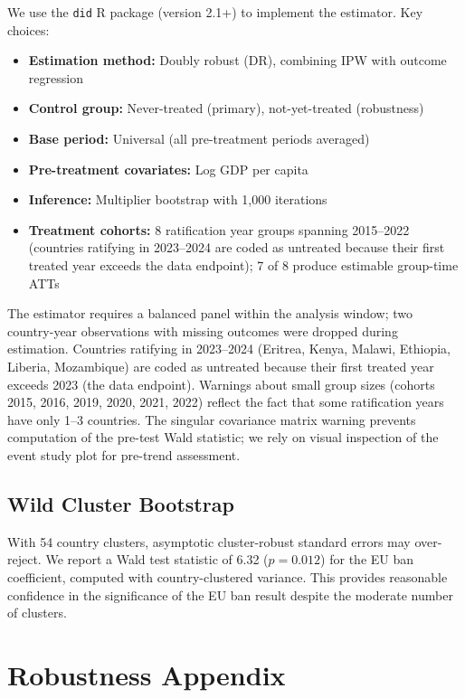 \documentclass[12pt]{article}
\begin{document}
We use the \texttt{did} R package (version 2.1+) to implement the \citet{callaway2021difference} estimator. Key choices:
\begin{itemize}
\item \textbf{Estimation method:} Doubly robust (DR), combining IPW with outcome regression \citep{santanna2020doubly}
\item \textbf{Control group:} Never-treated (primary), not-yet-treated (robustness)
\item \textbf{Base period:} Universal (all pre-treatment periods averaged)
\item \textbf{Pre-treatment covariates:} Log GDP per capita
\item \textbf{Inference:} Multiplier bootstrap with 1,000 iterations
\item \textbf{Treatment cohorts:} 8 ratification year groups spanning 2015--2022 (countries ratifying in 2023--2024 are coded as untreated because their first treated year exceeds the data endpoint); 7 of 8 produce estimable group-time ATTs
\end{itemize}

The estimator requires a balanced panel within the analysis window; two country-year observations with missing outcomes were dropped during estimation. Countries ratifying in 2023--2024 (Eritrea, Kenya, Malawi, Ethiopia, Liberia, Mozambique) are coded as untreated because their first treated year exceeds 2023 (the data endpoint). Warnings about small group sizes (cohorts 2015, 2016, 2019, 2020, 2021, 2022) reflect the fact that some ratification years have only 1--3 countries. The singular covariance matrix warning prevents computation of the pre-test Wald statistic; we rely on visual inspection of the event study plot for pre-trend assessment.

\subsection{Wild Cluster Bootstrap}

With 54 country clusters, asymptotic cluster-robust standard errors may over-reject. We report a Wald test statistic of 6.32 ($p = 0.012$) for the EU ban coefficient, computed with country-clustered variance. This provides reasonable confidence in the significance of the EU ban result despite the moderate number of clusters.


\section{Robustness Appendix}
\end{document}
